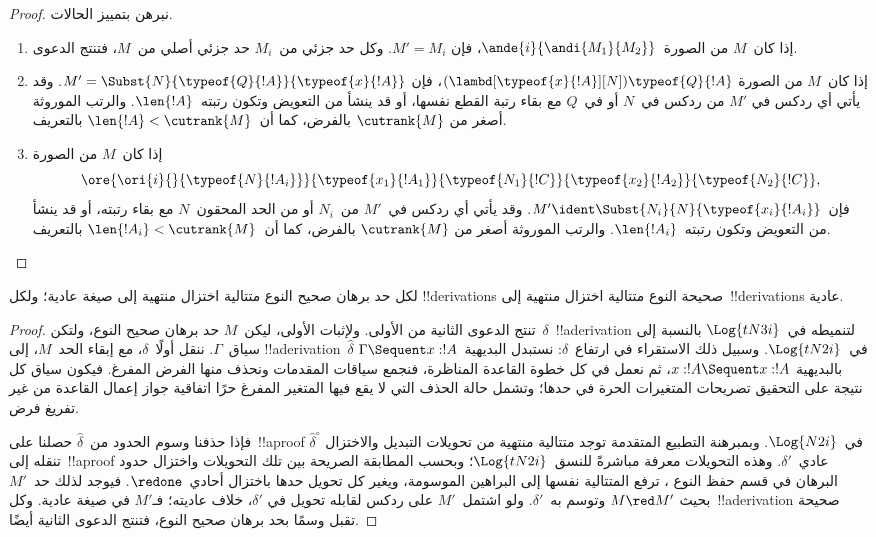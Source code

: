 \documentclass[../../../include/open-logic-section]{subfiles}
\begin{document}
\begin{proof}
  نبرهن بتمييز الحالات.
  \begin{enumerate}
  \item إذا كان~$M$ من الصورة~$\ande{i}{\andi{M_1}{M_2}}$، فإن
    $M'=M_i$. وكل حد جزئي من~$M_i$ حد جزئي أصلي من~$M$، فتنتج الدعوى.
  \item إذا كان~$M$ من الصورة
    $(\lambd[\typeof{x}{!A}][N])\typeof{Q}{!A}$، فإن
    $M'=\Subst{N}{\typeof{Q}{!A}}{\typeof{x}{!A}}$. وقد يأتي أي ردكس في
    $M'$ من ردكس في~$N$ أو في~$Q$ مع بقاء رتبة القطع نفسها، أو قد ينشأ من
    التعويض وتكون رتبته~$\len{!A}$. والرتب الموروثة أصغر من
    $\cutrank{M}$ بالفرض، كما أن~$\len{!A}<\cutrank{M}$ بالتعريف.
  \item إذا كان~$M$ من الصورة
    \[
    \ore{\ori{i}{}{\typeof{N}{!A_i}}}
        {\typeof{x_1}{!A_1}}{\typeof{N_1}{!C}}
        {\typeof{x_2}{!A_2}}{\typeof{N_2}{!C}},
    \]
    فإن~$M'\ident\Subst{N_i}{N}{\typeof{x_i}{!A_i}}$. وقد يأتي أي ردكس
    في~$M'$ من~$N_i$ أو من الحد المحقون~$N$ مع بقاء رتبته، أو قد ينشأ من
    التعويض وتكون رتبته~$\len{!A_i}$. والرتب الموروثة أصغر من
    $\cutrank{M}$ بالفرض، كما أن~$\len{!A_i}<\cutrank{M}$ بالتعريف.
  \end{enumerate}
\end{proof}

\begin{thm}
  لكل حد برهان صحيح النوع متتالية اختزال منتهية إلى صيغة عادية؛ ولكل
  !!{derivation}s صحيحة النوع متتالية اختزال منتهية إلى~!!{derivation}s
  عادية.
\end{thm}

\begin{proof}
  تنتج الدعوى الثانية من الأولى. ولإثبات الأولى، ليكن~$M$ حد برهان صحيح
  النوع، ولتكن~$\delta$~!!a{derivation} لتنميطه في~$\Log{tN3i}$ بالنسبة
  إلى سياق~$\Gamma$. ننقل أولًا~$\delta$، مع إبقاء الحد~$M$، إلى
  !!a{derivation}~$\widehat\delta$ في~$\Log{tN2i}$. وسبيل ذلك الاستقراء في
  ارتفاع~$\delta$: نستبدل البديهية~$\Gamma\Sequent x:!A$ بالبديهية
  $x:!A\Sequent x:!A$، ثم نعمل في كل خطوة القاعدة المناظرة، فنجمع سياقات
  المقدمات ونحذف منها الفرض المفرغ. فيكون سياق كل نتيجة على التحقيق
  تصريحات المتغيرات الحرة في حدها؛ وتشمل حالة الحذف التي لا يقع فيها
  المتغير المفرغ حرًا اتفاقية جواز إعمال القاعدة من غير تفريغ فرض.

  فإذا حذفنا وسوم الحدود من~$\widehat\delta$ حصلنا على~!!a{proof}
  $\widehat\delta^\circ$ في~$\Log{N2i}$. وبمبرهنة التطبيع المتقدمة
   توجد متتالية منتهية من
  تحويلات التبديل والاختزال تنقله إلى~!!a{proof} عادي~$\delta'$. وهذه
  التحويلات معرفة مباشرةً للنسق~$\Log{tN2i}$؛ وبحسب المطابقة الصريحة بين
  تلك التحويلات واختزال حدود البرهان في قسم حفظ النوع
  ، ترفع المتتالية نفسها إلى البراهين الموسومة،
  ويغير كل تحويل حدها باختزال أحادي~$\redone$. فيوجد لذلك حد~$M'$ بحيث
  $M\red M'$ وتوسم به~$\delta'$. ولو اشتمل~$M'$ على ردكس لقابله تحويل في
  $\delta'$، خلاف عاديته؛ فـ$M'$ في صيغة عادية. وكل~!!a{derivation} صحيحة
  تقبل وسمًا بحد برهان صحيح النوع، فتنتج الدعوى الثانية أيضًا.
\end{proof}
\end{document}
